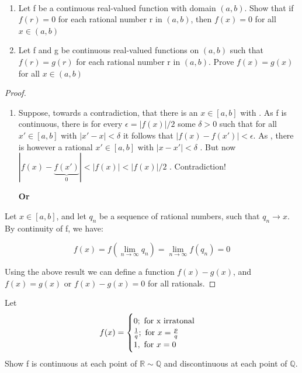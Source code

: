 \documentclass{notes}
\begin{document}
\paragraph{}
\begin{problem}
	\begin{enumerate}
		\item Let f be a continuous real-valued function with domain $(a, b)$.
		Show that if $f(r) = 0$ for each rational number r in $(a, b)$, then
		$f(x) = 0$ for all $x \in (a, b)$
		\item 
		Let f and g be continuous real-valued functions on $(a, b)$ such
		that $f(r) = g(r)$ for each rational number r in $(a, b)$. Prove
		$f(x) = g(x)$ for all $x \in (a, b)$
	\end{enumerate}
	
\end{problem}
\begin{proof}
	\begin{enumerate}
		\item 
		Suppose, towards a contradiction, that there is an $x \in [a,b]$ with . As f is continuous, there is for every $\epsilon = |f(x)|/2$ some $\delta>0$ such that for all $x' \in [a,b]$    with $|x' - x| <\delta$ it follows that $|f(x) - f(x')|<\epsilon$. As , there is however a rational $x' \in [a,b]$  with $|x - x'|<\delta$ . But now   $|f(x) - \underbrace{f(x')}_{0}| < |f(x)| < |f(x)|/2 $ . Contradiction!
		
		\begin{center}
			\textbf{Or}	\end{center}
	\end{enumerate}
	Let $x\in[a,b]$, and let ${q_n}$ be a sequence of rational numbers, such that $q_n\to x$. By continuity of f, we have:
	
	$$  
	f(x) = f(\lim_{n \to \infty} q_n) = \lim_{n \to \infty} f(q_n) = 0
	$$
	
	\item
	Using the above result we can define a function $f(x) - g(x)$, and $f(x) = g(x)$ or $f(x) - g(x) = 0$   for all rationals.
	
\end{proof}

\begin{problem} Let 
	$$
	f(x) = \begin{cases} 
	0;\ \text{for x irratonal} \\
	{1 \over q};\ \text{for}\ x = {p \over q }  \\
	1,\ \text{for}\ x=0
	\end{cases}
	$$
	Show f is
	continuous at each point of $\mathbb{R \sim Q}$ and discontinuous at each point
	of $\mathbb{Q}$.	
\end{problem}
\end{document}

